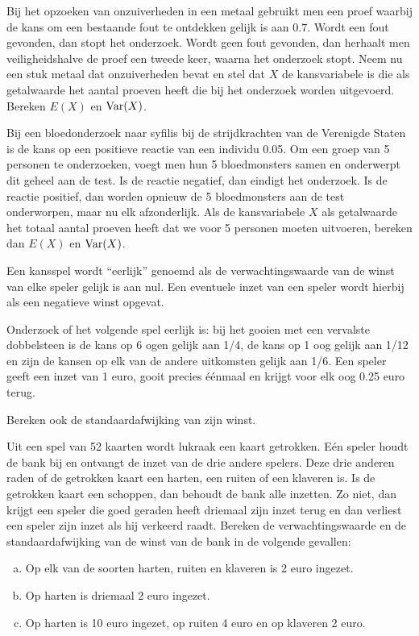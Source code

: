 \documentclass[a4paper,12pt, twoside]{article}
\begin{document}
\begin{oefening}
Bij het opzoeken van onzuiverheden in een metaal gebruikt men een proef waarbij de kans om een bestaande fout te ontdekken gelijk is aan $0.7$. Wordt een fout gevonden, dan stopt het onderzoek. Wordt geen fout gevonden, dan herhaalt men veiligheidshalve de proef een tweede keer, waarna het onderzoek stopt. Neem nu een stuk metaal dat onzuiverheden bevat en stel dat $X$ de kansvariabele is die als getalwaarde het aantal proeven heeft die bij het onderzoek worden uitgevoerd. Bereken $E(X)$ en $\Var(X)$.
\end{oefening}

\begin{oefening}
Bij een bloedonderzoek naar syfilis bij de strijdkrachten van de Verenigde Staten is de kans op een positieve reactie van een individu 0.05. Om een groep van 5 personen te onderzoeken, voegt men hun 5 bloedmonsters samen en onderwerpt dit geheel aan de test. Is de reactie negatief, dan eindigt het onderzoek. Is de reactie positief, dan worden opnieuw de 5 bloedmonsters aan de test onderworpen, maar nu elk afzonderlijk. Als de kansvariabele $X$ als getalwaarde het totaal aantal proeven heeft dat we voor 5 personen moeten uitvoeren, bereken dan $E(X)$ en $\Var(X)$.
\end{oefening}

\begin{oefening}
Een kansspel wordt “eerlijk” genoemd als de verwachtingswaarde van de winst van elke speler gelijk is aan nul. Een eventuele inzet van een speler wordt hierbij als een negatieve winst opgevat.

Onderzoek of het volgende spel eerlijk is: bij het gooien met een vervalste dobbelsteen is de kans op 6 ogen gelijk aan 1/4, de kans op 1 oog gelijk aan 1/12 en zijn de kansen op elk van de andere uitkomsten gelijk aan 1/6. Een speler geeft een inzet van 1 euro, gooit precies éénmaal en krijgt voor elk oog 0.25 euro terug.

Bereken ook de standaardafwijking van zijn winst.
\end{oefening}

\begin{oefening}
Uit een spel van 52 kaarten wordt lukraak een kaart getrokken. Eén speler houdt de bank bij en ontvangt de inzet van de drie andere spelers. Deze drie anderen raden of de getrokken kaart een harten, een ruiten of een klaveren is. Is de getrokken kaart een schoppen, dan behoudt de bank alle inzetten. Zo niet, dan krijgt een speler die goed geraden heeft driemaal zijn inzet terug en dan verliest een speler zijn inzet als hij verkeerd raadt. Bereken de verwachtingswaarde en de standaardafwijking van de winst van de bank in de volgende gevallen:

\begin{enumerate}[(a)]
  \item Op elk van de soorten harten, ruiten en klaveren is 2 euro ingezet.
  \item Op harten is driemaal 2 euro ingezet.
  \item Op harten is 10 euro ingezet, op ruiten 4 euro en op klaveren 2 euro.
\end{enumerate}
\end{oefening}
\end{document}
